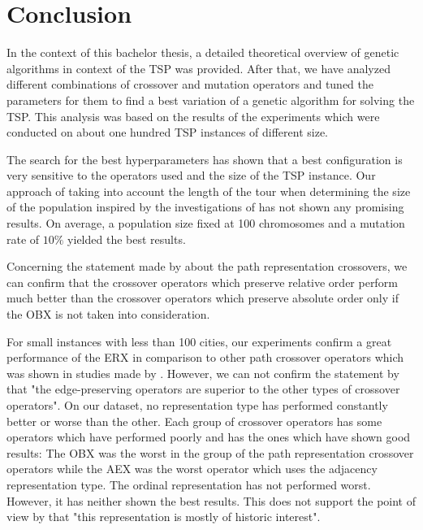 \section{Conclusion}
\label{sec:conclusion}

In the context of this bachelor thesis, a detailed theoretical overview of genetic algorithms in context of the TSP was provided. After that, we have analyzed different combinations of crossover and mutation operators and tuned the parameters for them to find a best variation of a genetic algorithm for solving the TSP. This analysis was based on the results of the experiments which were conducted on about one hundred TSP instances of different size.\par 

The search for the best hyperparameters has shown that a best configuration is very sensitive to the operators used and the size of the TSP instance. Our approach of taking into account the length of the tour when determining the size of the population inspired by the investigations of \citeauthor{chen2015measuring} \cite{chen2015measuring} has not shown any promising results. On average, a population size fixed at 100 chromosomes and a mutation rate of $10\%$ yielded the best results. \par 

Concerning the statement made by \citeauthor{potvin1996genetic} \cite{potvin1996genetic} about the path representation crossovers, we can confirm that the crossover operators which preserve relative order perform much better than the crossover operators which preserve absolute order only if the OBX is not taken into consideration.\par 

For small instances with less than 100 cities, our experiments confirm a great performance of the ERX in comparison to other path crossover operators which was shown in studies made by \citeauthor{starkweather1991comparison} \cite{starkweather1991comparison}. However, we can not confirm the statement by \citeauthor{potvin1996genetic} \cite{potvin1996genetic} that "the edge-preserving operators are superior to the other types of crossover operators". On our dataset, no representation type has performed constantly better or worse than the other. Each group of crossover operators has some operators which have performed poorly and has the ones which have shown good results: The OBX was the worst in the group of the path representation crossover operators while the AEX was the worst operator which uses the adjacency representation type. The ordinal representation has not performed worst. However, it has neither shown the best results. This does not support the point of view by \citeauthor{potvin1996genetic} \cite{potvin1996genetic} that "this representation is mostly of historic interest".\par

